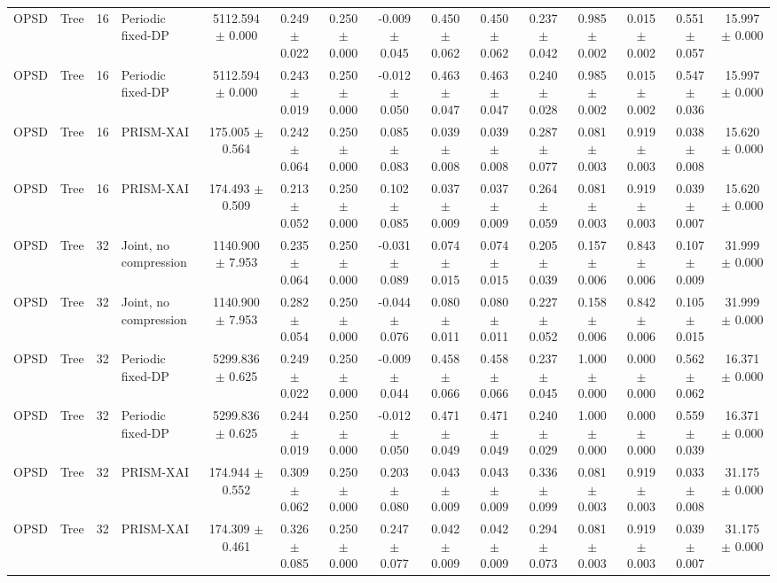 \begin{tabular}{llllccccccccccc}
OPSD & Tree & 16 & Periodic fixed-DP & 5112.594 $\pm$ 0.000 & 0.249 $\pm$ 0.022 & 0.250 $\pm$ 0.000 & -0.009 $\pm$ 0.045 & 0.450 $\pm$ 0.062 & 0.450 $\pm$ 0.062 & 0.237 $\pm$ 0.042 & 0.985 $\pm$ 0.002 & 0.015 $\pm$ 0.002 & 0.551 $\pm$ 0.057 & 15.997 $\pm$ 0.000 \\
OPSD & Tree & 16 & Periodic fixed-DP & 5112.594 $\pm$ 0.000 & 0.243 $\pm$ 0.019 & 0.250 $\pm$ 0.000 & -0.012 $\pm$ 0.050 & 0.463 $\pm$ 0.047 & 0.463 $\pm$ 0.047 & 0.240 $\pm$ 0.028 & 0.985 $\pm$ 0.002 & 0.015 $\pm$ 0.002 & 0.547 $\pm$ 0.036 & 15.997 $\pm$ 0.000 \\
OPSD & Tree & 16 & PRISM-XAI & 175.005 $\pm$ 0.564 & 0.242 $\pm$ 0.064 & 0.250 $\pm$ 0.000 & 0.085 $\pm$ 0.083 & 0.039 $\pm$ 0.008 & 0.039 $\pm$ 0.008 & 0.287 $\pm$ 0.077 & 0.081 $\pm$ 0.003 & 0.919 $\pm$ 0.003 & 0.038 $\pm$ 0.008 & 15.620 $\pm$ 0.000 \\
OPSD & Tree & 16 & PRISM-XAI & 174.493 $\pm$ 0.509 & 0.213 $\pm$ 0.052 & 0.250 $\pm$ 0.000 & 0.102 $\pm$ 0.085 & 0.037 $\pm$ 0.009 & 0.037 $\pm$ 0.009 & 0.264 $\pm$ 0.059 & 0.081 $\pm$ 0.003 & 0.919 $\pm$ 0.003 & 0.039 $\pm$ 0.007 & 15.620 $\pm$ 0.000 \\
OPSD & Tree & 32 & Joint, no compression & 1140.900 $\pm$ 7.953 & 0.235 $\pm$ 0.064 & 0.250 $\pm$ 0.000 & -0.031 $\pm$ 0.089 & 0.074 $\pm$ 0.015 & 0.074 $\pm$ 0.015 & 0.205 $\pm$ 0.039 & 0.157 $\pm$ 0.006 & 0.843 $\pm$ 0.006 & 0.107 $\pm$ 0.009 & 31.999 $\pm$ 0.000 \\
OPSD & Tree & 32 & Joint, no compression & 1140.900 $\pm$ 7.953 & 0.282 $\pm$ 0.054 & 0.250 $\pm$ 0.000 & -0.044 $\pm$ 0.076 & 0.080 $\pm$ 0.011 & 0.080 $\pm$ 0.011 & 0.227 $\pm$ 0.052 & 0.158 $\pm$ 0.006 & 0.842 $\pm$ 0.006 & 0.105 $\pm$ 0.015 & 31.999 $\pm$ 0.000 \\
OPSD & Tree & 32 & Periodic fixed-DP & 5299.836 $\pm$ 0.625 & 0.249 $\pm$ 0.022 & 0.250 $\pm$ 0.000 & -0.009 $\pm$ 0.044 & 0.458 $\pm$ 0.066 & 0.458 $\pm$ 0.066 & 0.237 $\pm$ 0.045 & 1.000 $\pm$ 0.000 & 0.000 $\pm$ 0.000 & 0.562 $\pm$ 0.062 & 16.371 $\pm$ 0.000 \\
OPSD & Tree & 32 & Periodic fixed-DP & 5299.836 $\pm$ 0.625 & 0.244 $\pm$ 0.019 & 0.250 $\pm$ 0.000 & -0.012 $\pm$ 0.050 & 0.471 $\pm$ 0.049 & 0.471 $\pm$ 0.049 & 0.240 $\pm$ 0.029 & 1.000 $\pm$ 0.000 & 0.000 $\pm$ 0.000 & 0.559 $\pm$ 0.039 & 16.371 $\pm$ 0.000 \\
OPSD & Tree & 32 & PRISM-XAI & 174.944 $\pm$ 0.552 & 0.309 $\pm$ 0.062 & 0.250 $\pm$ 0.000 & 0.203 $\pm$ 0.080 & 0.043 $\pm$ 0.009 & 0.043 $\pm$ 0.009 & 0.336 $\pm$ 0.099 & 0.081 $\pm$ 0.003 & 0.919 $\pm$ 0.003 & 0.033 $\pm$ 0.008 & 31.175 $\pm$ 0.000 \\
OPSD & Tree & 32 & PRISM-XAI & 174.309 $\pm$ 0.461 & 0.326 $\pm$ 0.085 & 0.250 $\pm$ 0.000 & 0.247 $\pm$ 0.077 & 0.042 $\pm$ 0.009 & 0.042 $\pm$ 0.009 & 0.294 $\pm$ 0.073 & 0.081 $\pm$ 0.003 & 0.919 $\pm$ 0.003 & 0.039 $\pm$ 0.007 & 31.175 $\pm$ 0.000 \\
\bottomrule
\end{tabular}
